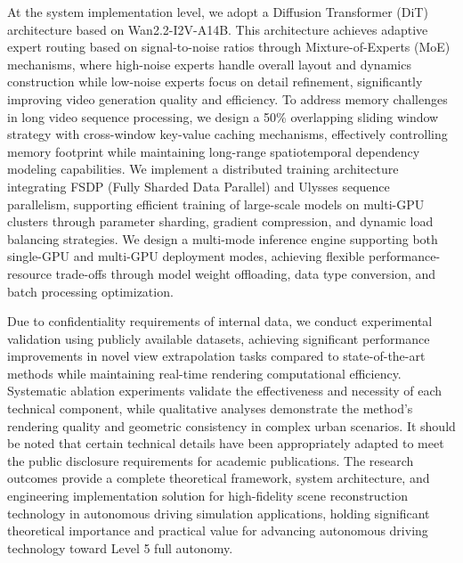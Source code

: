 \begin{abstract*}
  At the system implementation level, we adopt a Diffusion Transformer (DiT) architecture based on Wan2.2-I2V-A14B. This architecture achieves adaptive expert routing based on signal-to-noise ratios through Mixture-of-Experts (MoE) mechanisms, where high-noise experts handle overall layout and dynamics construction while low-noise experts focus on detail refinement, significantly improving video generation quality and efficiency. To address memory challenges in long video sequence processing, we design a 50\% overlapping sliding window strategy with cross-window key-value caching mechanisms, effectively controlling memory footprint while maintaining long-range spatiotemporal dependency modeling capabilities. We implement a distributed training architecture integrating FSDP (Fully Sharded Data Parallel) and Ulysses sequence parallelism, supporting efficient training of large-scale models on multi-GPU clusters through parameter sharding, gradient compression, and dynamic load balancing strategies. We design a multi-mode inference engine supporting both single-GPU and multi-GPU deployment modes, achieving flexible performance-resource trade-offs through model weight offloading, data type conversion, and batch processing optimization.

  Due to confidentiality requirements of internal data, we conduct experimental validation using publicly available datasets, achieving significant performance improvements in novel view extrapolation tasks compared to state-of-the-art methods while maintaining real-time rendering computational efficiency. Systematic ablation experiments validate the effectiveness and necessity of each technical component, while qualitative analyses demonstrate the method's rendering quality and geometric consistency in complex urban scenarios. It should be noted that certain technical details have been appropriately adapted to meet the public disclosure requirements for academic publications. The research outcomes provide a complete theoretical framework, system architecture, and engineering implementation solution for high-fidelity scene reconstruction technology in autonomous driving simulation applications, holding significant theoretical importance and practical value for advancing autonomous driving technology toward Level 5 full autonomy.

\end{abstract*}
